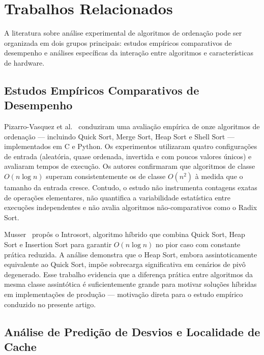 \documentclass[12pt]{article}
\begin{document}
\section{Trabalhos Relacionados}
\label{sec:related}

A literatura sobre análise experimental de algoritmos de ordenação
pode ser organizada em dois grupos principais: estudos empíricos
comparativos de desempenho e análises específicas da interação
entre algoritmos e características de hardware.

\subsection*{Estudos Empíricos Comparativos de Desempenho}

Pizarro-Vasquez et al.~\cite{pizarro2020} conduziram uma avaliação
empírica de onze algoritmos de ordenação --- incluindo Quick Sort,
Merge Sort, Heap Sort e Shell Sort --- implementados em C e Python.
Os experimentos utilizaram quatro configurações de entrada (aleatória,
quase ordenada, invertida e com poucos valores únicos) e avaliaram
tempos de execução. Os autores confirmaram que algoritmos de classe
$O(n \log n)$ superam consistentemente os de classe $O(n^2)$
à medida que o tamanho da entrada cresce. Contudo, o estudo não
instrumenta contagens exatas de operações elementares, não quantifica
a variabilidade estatística entre execuções independentes e não
avalia algoritmos não-comparativos como o Radix Sort.

Musser~\cite{musser1997} propôs o Introsort, algoritmo híbrido que
combina Quick Sort, Heap Sort e Insertion Sort para garantir
$O(n \log n)$ no pior caso com constante prática reduzida. A análise
demonstra que o Heap Sort, embora assintoticamente equivalente ao
Quick Sort, impõe sobrecarga significativa em cenários de pivô
degenerado. Esse trabalho evidencia que a diferença prática entre
algoritmos da mesma classe assintótica é suficientemente grande
para motivar soluções híbridas em implementações de produção ---
motivação direta para o estudo empírico conduzido no presente artigo.

\subsection*{Análise de Predição de Desvios e Localidade de Cache}
\end{document}
